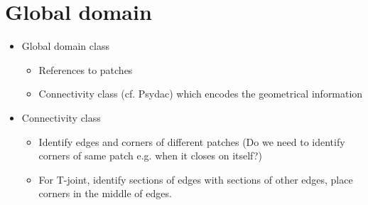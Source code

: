\documentclass[presentation.tex]{subfiles}
\begin{document}
\section{Global domain}
\begin{itemize}
    \item Global domain class
    \begin{itemize}
        \item References to patches
        \item Connectivity class (cf. Psydac) which encodes the geometrical information
    \end{itemize}
    \item Connectivity class
    \begin{itemize}
        \item Identify edges and corners of different patches (Do we need to identify
                corners of same patch e.g. when it closes on itself?)
        \item For T-joint, identify sections of edges with sections of other edges, 
                place corners in the middle of edges.
    \end{itemize}
    
\end{itemize}
\end{document}

